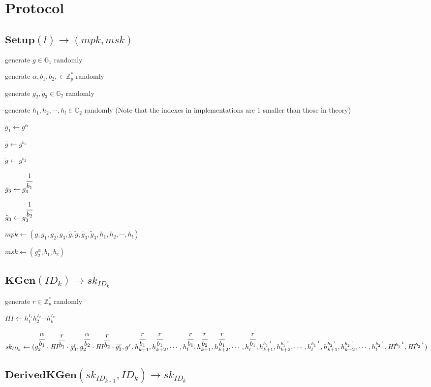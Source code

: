 \documentclass[a4paper]{article}
\begin{document}
\section{Protocol}

\subsection{$\textbf{Setup}(l) \rightarrow (\textit{mpk}, \textit{msk})$}

generate $g \in \mathbb{G}_1$ randomly

generate $\alpha, b_1, b_2, \in \mathbb{Z}_p^*$ randomly

generate $g_2, g_3 \in \mathbb{G}_2$ randomly

generate $h_1, h_2, \cdots, h_l \in \mathbb{G}_2$ randomly (Note that the indexes in implementations are 1 smaller than those in theory)

$g_1 \gets g^\alpha$

$\bar{g} \gets g^{b_1}$

$\tilde{g} \gets g^{b_2}$

$\bar{g}_3 \gets g_3^{\cfrac{1}{b_1}}$

$\tilde{g}_3 \gets g_3^{\cfrac{1}{b_2}}$

$\textit{mpk} \gets (g, g_1, g_2, g_3, \bar{g}, \tilde{g}, \bar{g}_3, \tilde{g}_3, h_1, h_2, \cdots, h_l)$

$\textit{msk} \gets (g_2^\alpha, b_1, b_2)$

\subsection{$\textbf{KGen}(\textit{ID}_k) \rightarrow \textit{sk}_{\textit{ID}_k}$}

generate $r \in \mathbb{Z}_p^*$ randomly

$\textit{HI} \gets h_1^{I_1}h_2^{I_2}\cdots h_k^{I_k}$

$\textit{sk}_{\textit{ID}_k} \gets (
g_2^{\cfrac{\alpha}{b_1}} \cdot \textit{HI}^{\cfrac{r}{b_1}} \cdot \bar{g}_3^r,
g_2^{\cfrac{\alpha}{b_2}} \cdot \textit{HI}^{\cfrac{r}{b_2}} \cdot \tilde{g}_3^r,
g^r,
h_{k + 1}^{\cfrac{r}{b_1}}, h_{k + 2}^{\cfrac{r}{b_1}}, \cdots, h_l^{\cfrac{r}{b_1}},
h_{k + 1}^{\cfrac{r}{b_2}}, h_{k + 2}^{\cfrac{r}{b_1}}, \cdots, h_l^{\cfrac{r}{b_1}},
h_{k + 1}^{b_1^{-1}}, h_{k + 2}^{b_1^{-1}}, \cdots, h_l^{b_1^{-1}},
h_{k + 1}^{b_2^{-1}}, h_{k + 2}^{b_2^{-1}}, \cdots, h_l^{b_2^{-1}},
\textit{HI}^{b_1^{-1}}, \textit{HI}^{b_2^{-1}}
)$

\subsection{$\textbf{DerivedKGen}(\textit{sk}_{\textit{ID}_\textit{k - 1}}, \textit{ID}_k) \rightarrow \textit{sk}_{\textit{ID}_k}$}
\end{document}
